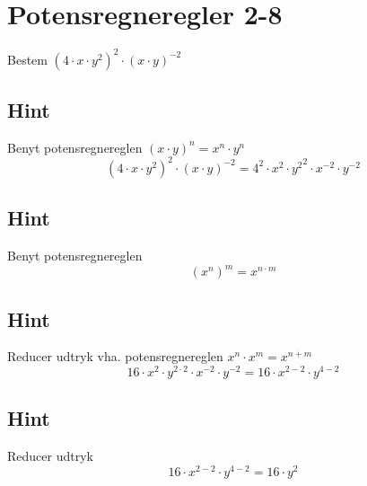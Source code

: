 \documentclass{article}
\newenvironment{exercise}[1]{\newpage\section{#1}}{}
\newcommand{\answerbox}[1]{\fbox{$#1$}}
\newcommand{\hint}{\subsection*{Hint}}
\begin{document}
\begin{exercise}{Potensregneregler 2-8}
	
	Bestem $(4 \cdot x \cdot y^2)^2 \cdot (x \cdot y)^{-2}$
	
	\answerbox{16 \cdot y^2}
	
	\hint
	
	Benyt potensregnereglen $(x \cdot y)^n = x^n \cdot y^n$
	\[
	(4 \cdot x \cdot y^2)^2 \cdot (x \cdot y)^{-2} = 4^2 \cdot x^2 \cdot {y^2}^2 \cdot x^{-2} \cdot y^{-2}
	\]
		
	\hint
	Benyt potensregnereglen 
	\[
	(x^n)^m = x^{n \cdot m}
	\]
	
	\hint 
	Reducer udtryk vha. potensregnereglen $x^n \cdot x^m  = x^{n+m}$
	\[
	16 \cdot x^2 \cdot y^{2\cdot 2} \cdot x^{-2} \cdot y^{-2} = 16 \cdot x^{2-2} \cdot y^{4-2}
	\]
	
	\hint 
	
	Reducer udtryk
	\[
	16 \cdot x^{2-2} \cdot y^{4-2} = 16 \cdot y^2
	\]
	
\end{exercise}
\end{document}
